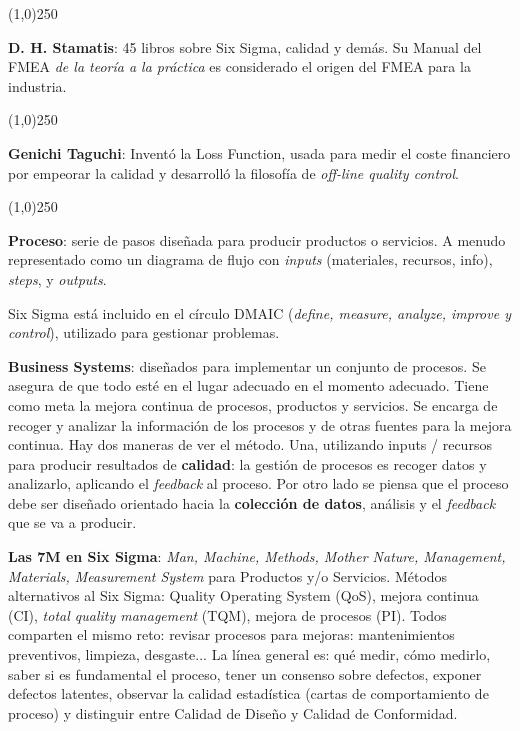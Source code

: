\documentclass[]{article}
\begin{document}
\begin{center}
	\line(1,0){250}
\end{center}
\textbf{D. H. Stamatis}: 45 libros sobre Six Sigma, calidad y demás. Su Manual del FMEA \textit{de la teoría a la práctica} es considerado el origen del FMEA para la industria.
\begin{center}
	\line(1,0){250}
\end{center}
\textbf{Genichi Taguchi}: Inventó la Loss Function, usada para medir el coste financiero por empeorar la calidad y desarrolló la filosofía de \textit{off-line quality control}. 
\begin{center}
	\line(1,0){250}
\end{center}
\textbf{Proceso}: serie de pasos diseñada para producir productos o servicios. A menudo representado como un diagrama de flujo con \textit{inputs} (materiales, recursos, info), \textit{steps}, y \textit{outputs}. 

Six Sigma está incluido en el círculo DMAIC (\textit{define, measure, analyze, improve y control}), utilizado para gestionar problemas.

\textbf{Business Systems}: diseñados para implementar un conjunto de procesos. Se asegura de que todo esté en el lugar adecuado en el momento adecuado. Tiene como meta la mejora continua de procesos, productos y servicios. Se encarga de recoger y analizar la información de los procesos y de otras fuentes para la mejora continua. \newline
Hay dos maneras de ver el método. Una, utilizando inputs / recursos para producir resultados de \textbf{calidad}: la gestión de procesos es recoger datos y analizarlo, aplicando el \textit{feedback} al proceso. Por otro lado se piensa que el proceso debe ser diseñado orientado hacia la \textbf{colección de datos}, análisis y el \textit{feedback} que se va a producir.

\textbf{Las 7M en Six Sigma}: \textit{Man, Machine, Methods, Mother Nature, Management, Materials, Measurement System} para Productos y/o Servicios. \newline Métodos alternativos al Six Sigma: Quality Operating System (QoS), mejora continua (CI), \textit{total quality management} (TQM), mejora de procesos (PI). Todos comparten el mismo reto: revisar procesos para mejoras: mantenimientos preventivos, limpieza, desgaste... \newline La línea general es: qué medir, cómo medirlo, saber si es fundamental el proceso, tener un consenso sobre defectos, exponer defectos latentes, observar la calidad estadística (cartas de comportamiento de proceso) y distinguir entre Calidad de Diseño y Calidad de Conformidad. 
\end{document}
